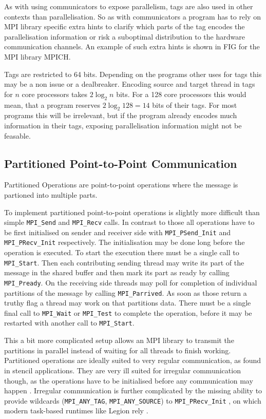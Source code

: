 \documentclass[sigconf]{acmart}
\begin{document}
As with using communicators to expose parallelism, tags are also used in other contexts than parallelisation.
So as with communicators a program has to rely on MPI library specific extra hints to clarify which parts of the tag encodes the parallelisation information or risk a suboptimal distribution to the hardware communication channels.
An example of such extra hints is shown in FIG for the MPI library MPICH. %

Tags are restricted to 64 bits.
Depending on the programs other uses for tags this may be a non issue or a dealbreaker.
Encoding source and target thread in tags for $n$ core processors takes $2\log_2{n}$ bits.
For a 128 core processors this would mean, that a program reserves $2\log_2{128} = 14$ bits of their tags.
For most programs this will be irrelevant, but if the program already encodes much information in their tags, exposing parallelisation information might not be feasable.

\subsection{Partitioned Point-to-Point Communication}


Partitioned Operations are point-to-point operations where the message is partioned into multiple parts.

To implement partitioned point-to-point operations is slightly more difficult than simple \verb|MPI_Send| and \verb|MPI_Recv| calls.
In contrast to those all operations have to be first initialised on sender and receiver side with \verb|MPI_PSend_Init| and \verb|MPI_PRecv_Init| respectively.
The initialisation may be done long before the operation is executed.
To start the execution there must be a single call to \verb|MPI_Start|.
Then each contributing sending thread may write its part of the message in the shared buffer and then mark its part as ready by calling \verb|MPI_Pready|.
On the receiving side threads may poll for completion of individual partitions of the message by calling \verb|MPI_Parrived|.
As soon as those return a truthy flag a thread may work on that partitions data.
There must be a single final call to \verb|MPI_Wait| or \verb|MPI_Test| to complete the operation, before it may be restarted with another call to \verb|MPI_Start|.

This a bit more complicated setup allows an MPI library to transmit the partitions in parallel instead of waiting for all threads to finish working.
Partitioned operations are ideally suited to very regular communication, as found in stencil applications.
They are very ill suited for irregular communication though, as the operations have to be initialised before any communication may happen \cite{zambreLessonsLearned2022}.
Irregular communication is further complicated by the missing ability to provide wildcards (\verb|MPI_ANY_TAG|, \verb|MPI_ANY_SOURCE|) to \verb|MPI_PRecv_Init| \cite{mpi40}, on which modern task-based runtimes like Legion rely \cite{zambreLessonsLearned2022}.
\end{document}
